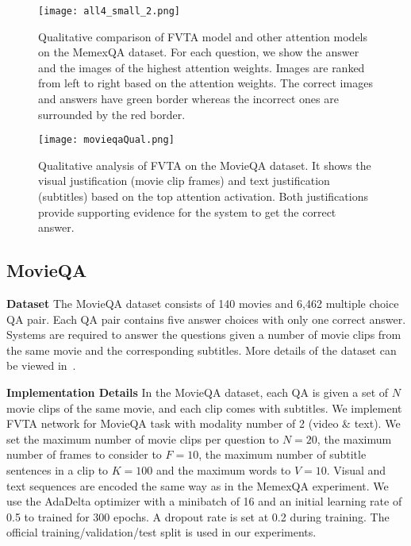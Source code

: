 \begin{figure*}[!t]
	\centering
		\texttt{[image: all4\_small\_2.png]}
	\caption{ 
	Qualitative comparison of FVTA model and other attention models on the MemexQA dataset. For each question, we show the answer and the images of the highest attention weights. Images are ranked from left to right based on the attention weights. The correct images and answers have green border whereas the incorrect ones are surrounded by the red border. }
	\label{FVT_comp_vis}
\end{figure*}

\begin{figure*}[!t]
	\centering
		\texttt{[image: movieqaQual.png]}
	\caption{ 
	Qualitative analysis of FVTA on the MovieQA dataset. It shows the visual justification (movie clip frames) and text justification (subtitles) based on the top attention activation. Both justifications provide supporting evidence for the system to get the correct answer.
	}
	\label{FVT_comp_movieqa_vis}
\end{figure*}

\subsection{MovieQA}
\noindent\textbf{Dataset}
The MovieQA dataset consists of 140 movies and 6,462 multiple choice QA pair. Each QA pair contains five answer choices with only one correct answer. Systems are required to answer the questions given a number of movie clips from the same movie and the corresponding subtitles. 
More details of the dataset can be viewed in~\cite{tapaswi2016movieqa}.


\noindent\textbf{Implementation Details}
\label{sec-impl2}
In the MovieQA dataset, each QA is given a set of $N$ movie clips of the same movie, and each clip comes with subtitles. We implement FVTA network for MovieQA task with modality number of 2 (video \& text). 
We set the maximum number of movie clips per question to $N=20$, the maximum number of frames to consider to $F=10$, the maximum number of subtitle sentences in a clip to $K=100$ and the maximum words to $V=10$. Visual and text sequences are encoded the same way as in the MemexQA \cite{jiang2017memexqa} experiment.  
We use the AdaDelta \cite{zeiler2012adadelta} optimizer with a minibatch of 16 and an initial learning rate of 0.5 to trained for 300 epochs. A dropout rate is set at 0.2 during training. 
The official training/validation/test split is used in our experiments.




